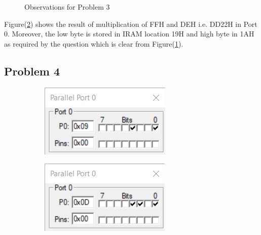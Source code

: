 \documentclass{lab_sheet}
\begin{document}
\begin{figure}[H]
\begin{subfigure}{.5\textwidth}
  \caption{}
  \label{fig:prob3-c}
\end{subfigure}
\hspace*{\fill}
\caption{Observations for Problem 3}
\label{fig:prob3}
\end{figure}
Figure(\ref{fig:prob3}) shows the result of multiplication of FFH and DEH i.e. DD22H in Port 0. Moreover, the low byte is stored in IRAM location 19H and high byte in 1AH as required by the question which is clear from Figure(\ref{fig:prob3-c}).
\subsection*{Problem 4}
\begin{figure}[H]
\begin{subfigure}{.5\textwidth}
  \centering
  \includegraphics[frame,width=.8\linewidth]{../Figures/1_4_a.png}  
  \label{fig:prob4-a}
  \caption{}
\end{subfigure}
\begin{subfigure}{.5\textwidth}
  \centering
  \includegraphics[frame,width=.8\linewidth]{../Figures/1_4_b.png}  
  \label{fig:prob4-b}
  \caption{}
\end{subfigure}
\newline
\hspace*{\fill}
\begin{subfigure}{.5\textwidth}
  \centering

\end{subfigure}
\end{figure}
\end{document}
